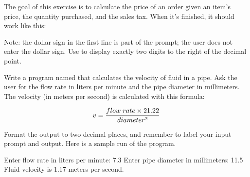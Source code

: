 \begin{exercise} 
\label{ex:purchase}

The goal of this exercise is to calculate the price of an order given an item's price, the quantity purchased, and the sales tax.
When it's finished, it should work like this:


Note: the dollar sign in the first line is part of the prompt; the user does not enter the dollar sign.
Use  to display exactly two digits to the right of the decimal point.

\end{exercise}

\begin{exercise}
Write a program named  that calculates the velocity of fluid in a pipe. Ask the user for the flow rate in liters per minute and the pipe diameter in millimeters. The velocity (in meters per second) is calculated with this formula:

\begin{equation*}
v = {flow\; rate \times 21.22 \over diameter^2}
\end{equation*}

Format the output to two decimal places, and remember to label your input prompt and output. Here is a sample run of the program.

\begin{stdout}
Enter flow rate in liters per minute: 7.3
Enter pipe diameter in millimeters: 11.5
Fluid velocity is 1.17 meters per second.
\end{stdout}

\end{exercise}

